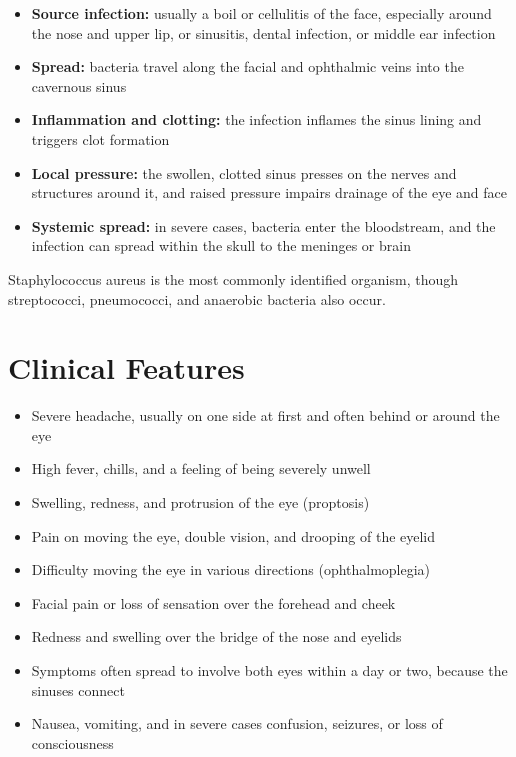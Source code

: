 \begin{itemize}
    \item \textbf{Source infection:} usually a boil or cellulitis of the face, especially around the nose and upper lip, or sinusitis, dental infection, or middle ear infection
    \item \textbf{Spread:} bacteria travel along the facial and ophthalmic veins into the cavernous sinus
    \item \textbf{Inflammation and clotting:} the infection inflames the sinus lining and triggers clot formation
    \item \textbf{Local pressure:} the swollen, clotted sinus presses on the nerves and structures around it, and raised pressure impairs drainage of the eye and face
    \item \textbf{Systemic spread:} in severe cases, bacteria enter the bloodstream, and the infection can spread within the skull to the meninges or brain
\end{itemize}

Staphylococcus aureus is the most commonly identified organism, though streptococci, pneumococci, and anaerobic bacteria also occur.

\section*{Clinical Features}
\begin{itemize}
    \item Severe headache, usually on one side at first and often behind or around the eye
    \item High fever, chills, and a feeling of being severely unwell
    \item Swelling, redness, and protrusion of the eye (proptosis)
    \item Pain on moving the eye, double vision, and drooping of the eyelid
    \item Difficulty moving the eye in various directions (ophthalmoplegia)
    \item Facial pain or loss of sensation over the forehead and cheek
    \item Redness and swelling over the bridge of the nose and eyelids
    \item Symptoms often spread to involve both eyes within a day or two, because the sinuses connect
    \item Nausea, vomiting, and in severe cases confusion, seizures, or loss of consciousness
\end{itemize}

